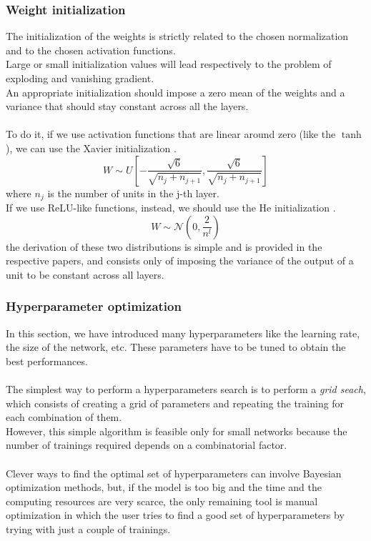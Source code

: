 \subsubsection*{Weight initialization}
The initialization of the weights is strictly related to the chosen normalization and to the chosen activation functions.\\
Large or small initialization values will lead respectively to the problem of exploding and vanishing gradient.\\
An appropriate initialization should impose a zero mean of the weights and a variance that should stay constant across all the layers.\\
\\
To do it, if we use activation functions that are linear around zero (like the $\tanh$), we can use the Xavier initialization \cite{Glorot2010UnderstandingNetworks}.
\begin{equation}
    W\sim U \left[-\frac{\sqrt{6}}{\sqrt{n_j+n_{j+1}}},\frac{\sqrt{6}}{\sqrt{n_j+n_{j+1}}} \right]
\end{equation}
where $n_j$ is the number of units in the j-th layer.\\
If we use ReLU-like functions, instead, we should use the He initialization \cite{he2015delving}.
\begin{equation}
    W\sim \mathcal{N}\left(0,\frac{2}{n^l}\right)
\end{equation}
the derivation of these two distributions is simple and is provided in the respective papers, and consists only of imposing the variance of the output of a unit to be constant across all layers.

\subsubsection*{Hyperparameter optimization}
In this section, we have introduced many hyperparameters like the learning rate, the size of the network, etc. These parameters have to be tuned to obtain the best performances.\\
\\
The simplest way to perform a hyperparameters search is to perform a \textit{grid seach}, which consists of creating a grid of parameters and repeating the training for each combination of them.\\
However, this simple algorithm is feasible only for small networks because the number of trainings required depends on a combinatorial factor.\\
\\
Clever ways to find the optimal set of hyperparameters can involve Bayesian optimization methods, but, if the model is too big and the time and the computing resources are very scarce, the only remaining tool is manual optimization in which the user tries to find a good set of hyperparameters by trying with just a couple of trainings.


